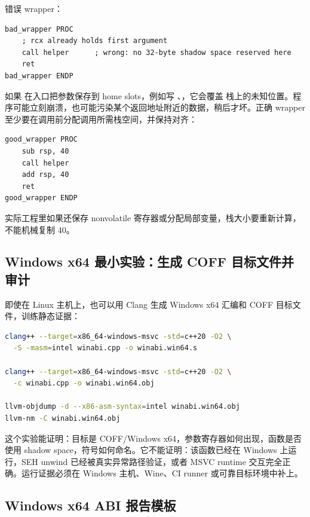 错误 wrapper：

\begin{lstlisting}[numbers=none,caption={错误：调用 helper 前未预留 shadow space}]
bad_wrapper PROC
    ; rcx already holds first argument
    call helper      ; wrong: no 32-byte shadow space reserved here
    ret
bad_wrapper ENDP
\end{lstlisting}

如果  在入口把参数保存到 home slots，例如写 \code{[rsp+8]}、\code{[rsp+16]}，它会覆盖  栈上的未知位置。程序可能立刻崩溃，也可能污染某个返回地址附近的数据，稍后才坏。正确 wrapper 至少要在调用前分配调用所需栈空间，并保持对齐：

\begin{lstlisting}[numbers=none,caption={正确方向：为嵌套调用准备调用帧}]
good_wrapper PROC
    sub rsp, 40
    call helper
    add rsp, 40
    ret
good_wrapper ENDP
\end{lstlisting}

实际工程里如果还保存 nonvolatile 寄存器或分配局部变量，栈大小要重新计算，不能机械复制 40。

\subsection{Windows x64 最小实验：生成 COFF 目标文件并审计}

即使在 Linux 主机上，也可以用 Clang 生成 Windows x64 汇编和 COFF 目标文件，训练静态证据：

\begin{lstlisting}[language=bash,caption={生成 Windows x64 ABI 静态证据}]
clang++ --target=x86_64-windows-msvc -std=c++20 -O2 \
  -S -masm=intel winabi.cpp -o winabi.win64.s

clang++ --target=x86_64-windows-msvc -std=c++20 -O2 \
  -c winabi.cpp -o winabi.win64.obj

llvm-objdump -d --x86-asm-syntax=intel winabi.win64.obj
llvm-nm -C winabi.win64.obj
\end{lstlisting}

这个实验能证明：目标是 COFF/Windows x64，参数寄存器如何出现，函数是否使用 shadow space，符号如何命名。它不能证明：该函数已经在 Windows 上运行，SEH unwind 已经被真实异常路径验证，或者 MSVC runtime 交互完全正确。运行证据必须在 Windows 主机、Wine、CI runner 或可靠目标环境中补上。

\subsection{Windows x64 ABI 报告模板}

